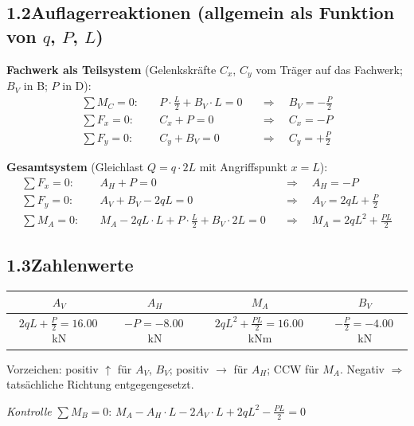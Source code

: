 \documentclass[a4paper,11pt]{article}
\begin{document}
\subsection*{1.2\quad Auflagerreaktionen (allgemein als Funktion von $q$, $P$, $L$)}

\textbf{Fachwerk als Teilsystem}
(Gelenkskräfte $C_x$, $C_y$ vom Träger auf das Fachwerk; $B_V$ in B; $P$ in D):
\begin{align*}
  \sum M_C = 0:\quad & P \cdot \tfrac{L}{2} + B_V \cdot L = 0
    &&\Rightarrow\quad \boxed{B_V = -\tfrac{P}{2}} \\
  \sum F_x = 0:\quad & C_x + P = 0
    &&\Rightarrow\quad C_x = -P \\
  \sum F_y = 0:\quad & C_y + B_V = 0
    &&\Rightarrow\quad C_y = +\tfrac{P}{2}
\end{align*}

\textbf{Gesamtsystem} (Gleichlast $Q = q \cdot 2L$ mit Angriffspunkt $x = L$):
\begin{align*}
  \sum F_x = 0:\quad & A_H + P = 0
    &&\Rightarrow\quad \boxed{A_H = -P} \\
  \sum F_y = 0:\quad & A_V + B_V - 2qL = 0
    &&\Rightarrow\quad \boxed{A_V = 2qL + \tfrac{P}{2}} \\
  \sum M_A = 0:\quad & M_A - 2qL \cdot L + P\cdot\tfrac{L}{2} + B_V \cdot 2L = 0
    &&\Rightarrow\quad \boxed{M_A = 2qL^2 + \tfrac{PL}{2}}
\end{align*}

\subsection*{1.3\quad Zahlenwerte}

\begin{center}
\begin{tabular}{cccc}
\toprule
$A_V$ & $A_H$ & $M_A$ & $B_V$ \\
\midrule
$2qL + \tfrac{P}{2} = \mathbf{16.00}$\,kN
& $-P = \mathbf{-8.00}$\,kN
& $2qL^2 + \tfrac{PL}{2} = \mathbf{16.00}$\,kNm
& $-\tfrac{P}{2} = \mathbf{-4.00}$\,kN \\
\bottomrule
\end{tabular}
\end{center}

Vorzeichen: positiv $\uparrow$ für $A_V$, $B_V$; positiv $\rightarrow$ für $A_H$;
CCW für $M_A$. Negativ $\Rightarrow$ tatsächliche Richtung entgegengesetzt.

\textit{Kontrolle} $\sum M_B = 0$:
$M_A - A_H \cdot L - 2A_V \cdot L + 2qL^2 - \tfrac{PL}{2} = 0$\;
\checkmark
\end{document}
